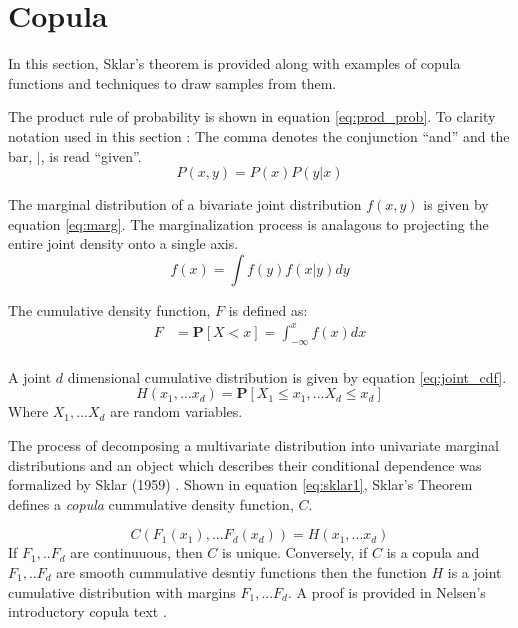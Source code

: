 \section{Copula}

In this section, Sklar's theorem is provided along with examples of copula functions
and techniques to draw samples from them. 

The product rule of probability is shown in equation \ref{eq:prod_prob}.  To clarity notation used in this section : The comma denotes the conjunction ``and'' and the bar, $|$, is read ``given''.
\begin{equation}
P(x, y) = P(x) P(y | x)
\label{eq:prod_prob}
\end{equation}

The marginal distribution of a bivariate joint distribution $f(x, y)$ is given by equation \ref{eq:marg}.  The marginalization process is analagous to projecting the entire joint density onto a single axis.
\begin{equation}
f(x) = \int f(y) f(x|y) dy
\label{eq:marg}
\end{equation}

The cumulative density function, $F$ is defined as:
\begin{align*} 
F &= \mathbf{P}[X < x] = \int_{-\infty}^x f(x)dx \\
\end{align*}

A joint $d$ dimensional cumulative distribution is given by equation \ref{eq:joint_cdf}.
\begin{equation}
H(x_1, ... x_d) = \mathbf P[X_1 \leq x_1, ... X_d \leq x_d]
\label{eq:joint_cdf}
\end{equation}
Where $X_1, ... X_d$ are random variables.

The process of decomposing a multivariate distribution into univariate marginal
distributions and an object which describes their conditional dependence was
formalized by Sklar (1959) \cite{Sklar1959}.  Shown in equation \ref{eq:sklar1},  Sklar's Theorem
defines a \emph{copula} cummulative density function, $C$.

\begin{equation}
C(F_1(x_1), ... F_d(x_d)) = H(x_1, ... x_d)
\label{eq:sklar1}
\end{equation}
If $F_1, .. F_d$ are continuuous, then $C$ is unique.  Conversely, if $C$ is a copula and $F_1, .. F_d$ are smooth cummulative desntiy functions then the function $H$ is a joint cumulative distribution with margins $F_1, ... F_d$.  A proof is provided in Nelsen's introductory copula text \cite{Nelsen2006}.

